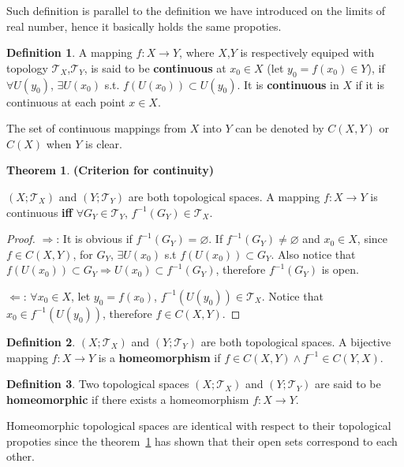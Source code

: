 \documentclass{article}
\theoremstyle{plain}
\theoremstyle{definition}
\newtheorem{dfn}{Definition}[section] %
\newtheorem{thrm}{Theorem}[section] %
\begin{document}
Such definition is parallel to the definition we have introduced on the limits of real number, hence it basically holds the same propoties. 
\begin{dfn}\label{continuous}
A mapping $f:X\to Y$, where $X$,$Y$ is respectively equiped with topology $\mathscr{T}_X$,$\mathscr{T}_Y$, is said to be \textbf{continuous} at $x_0\in X$ (let $y_0 = f( x_0 ) \in Y$), if $\forall U( y_0 )$, $\exists U( x_0 )$ s.t. $f( U(x_0) )\subset U( y_0 )$. It is \textbf{continuous} in $X$ if it is continuous at each point $x\in X$. 
\end{dfn}
The set of continuous mappings from $X$ into $Y$ can be denoted by $C(X,Y)$ or $C(X)$ when $Y$ is clear. 
\begin{thrm}\label{criterion_continuity}
\textbf{(Criterion for continuity)}

\noindent 
$(X;\mathscr{T}_X)$ and $(Y;\mathscr{T}_Y)$ are both topological spaces. A mapping $f: X\to Y$ is continuous \textbf{iff} $\forall G_Y\in \mathscr{T}_Y$, $f ^{-1} ( G_Y ) \in \mathscr{T}_X$.
\end{thrm}
\begin{proof}
$\Rightarrow$: It is obvious if $f  ^{-1}(G_Y) = \varnothing$. If $f  ^{-1}(G_Y) \neq \varnothing$ and $x_0 \in X$, since $f \in C(X,Y)$, for $G_Y$, $\exists U( x_0) $ s.t $f ( U( x_0)) \subset G_Y$. Also notice that $f ( U( x_0)) \subset G_Y \Rightarrow U( x_0) \subset f  ^{-1}(G_Y)$, therefore $f  ^{-1}(G_Y) $ is open.

$\Leftarrow$: $\forall x_0 \in X$, let $y_0 = f ( x_0)$, $f ^{-1} ( U( y_0)) \in \mathscr{T}_X$. Notice that $x_0 \in f ^{-1} ( U( y_0))$, therefore $f \in C( X, Y) $.
\end{proof}
\begin{dfn}\label{homeomorphism}
$(X;\mathscr{T}_X)$ and $(Y;\mathscr{T}_Y)$ are both topological spaces. A bijective mapping $f: X\to Y$ is a \textbf{homeomorphism} if $f \in C( X, Y) \wedge f ^{ -1} \in C( Y, X)$. 
\end{dfn}
\begin{dfn}\label{homeomorphic}
Two topological spaces $(X;\mathscr{T}_X)$ and $(Y;\mathscr{T}_Y)$ are said to be \textbf{homeomorphic} if there exists a homeomorphism $f: X\to Y$.
\end{dfn}
Homeomorphic topological spaces are identical with respect to their topological propoties since the theorem~\ref{criterion_continuity} has shown that their open sets correspond to each other.
\end{document}
